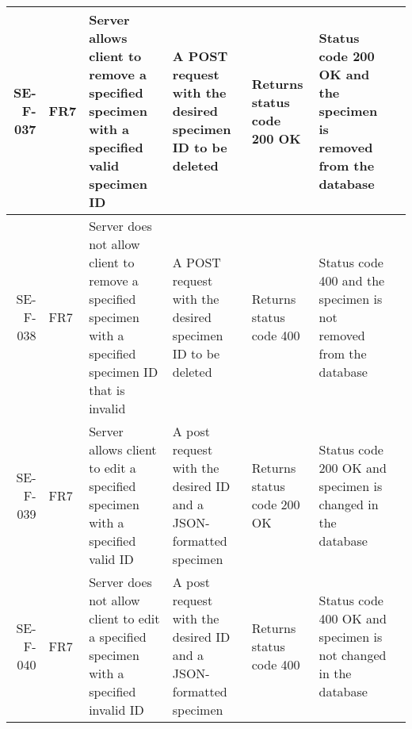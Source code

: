 \begin{landscape}
\begin{longtable}{|r|l|p{4cm}|p{4cm}|p{4cm}|p{4cm}|l|}
		SE-F-037 & FR7 & Server allows client to remove a specified specimen with a specified valid specimen ID &  A POST request with the desired specimen ID to be deleted &  Returns status code 200 OK &  Status code 200 OK and the specimen is removed from the database & \\ \hline
		SE-F-038 & FR7 & Server does not allow client to remove a specified specimen with a specified specimen ID that is invalid&  A POST request with the desired specimen ID to be deleted &  Returns status code 400 &  Status code 400 and the specimen is not removed from the database & \\ \hline
		SE-F-039 & FR7 & Server allows client to edit a specified specimen with a specified valid ID & A post request with the desired ID and a JSON-formatted specimen & Returns status code 200 OK  & Status code 200 OK and specimen is changed in the database & \\ \hline
		SE-F-040 & FR7 & Server does not allow client to edit a specified specimen with a specified invalid ID & A post request with the desired ID and a JSON-formatted specimen & Returns status code 400  & Status code 400 OK and specimen is not changed in the database & \\ \hline
		\end{longtable}
	\end{landscape}
